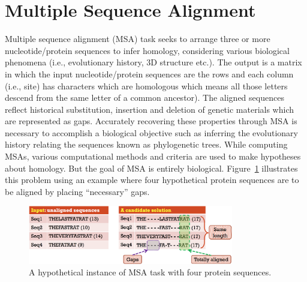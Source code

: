 \section{Multiple Sequence Alignment}
Multiple sequence alignment (MSA) task seeks to arrange three or more nucleotide/protein sequences to infer homology, considering various biological phenomena (i.e., evolutionary history, 3D structure etc.). The output is a matrix in which the input nucleotide/protein sequences are the rows and each column (i.e., site) has characters which are homologous which means all those letters descend from the same letter of a common ancestor). The aligned sequences reflect historical substitution, insertion and deletion of genetic materials which are represented as gaps. Accurately recovering these properties through MSA is necessary to accomplish a biological objective such as inferring the evolutionary history relating the sequences known as phylogenetic trees. While computing MSAs, various computational methods and criteria are used to make hypotheses about homology. But the goal of MSA is entirely biological. Figure~\ref{fig:msa_io} illustrates this problem using an example where four hypothetical protein sequences are to be aligned by placing ``necessary'' gaps. %

\begin{figure}[!htbp]
	\centering
	\includegraphics[width=0.8\textwidth]{cybernatics/Figure/msa_io}
	\caption{A hypothetical instance of MSA task with four protein sequences.} 
	\label{fig:msa_io}
\end{figure}

\graphicspath{{cybernatics/supp/}}
 
